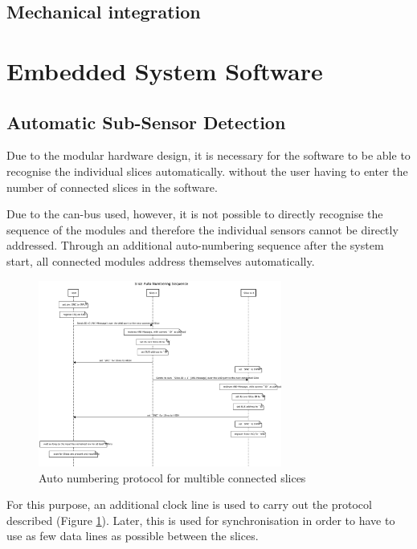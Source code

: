 \documentclass[conference]{IEEEtran}
\begin{document}
\subsection{Mechanical integration}

%



\section{Embedded System Software}

\subsection{Automatic Sub-Sensor Detection}

Due to the modular hardware design, it is necessary for the software to be able to recognise the individual slices automatically.
without the user having to enter the number of connected slices in the software.

Due to the can-bus used, however, it is not possible to directly recognise the sequence of the modules and therefore the individual sensors cannot be directly addressed.
Through an additional auto-numbering sequence after the system start, all connected modules address themselves automatically.

\begin{figure}[htbp]
\centerline{\includegraphics[width=8cm]{anp.png}}
\caption{Auto numbering protocol for multible connected slices}
\label{anp_fig}
\end{figure}

For this purpose, an additional clock line is used to carry out the protocol described (Figure \ref{anp_fig}). Later, this is used for synchronisation in order to have to use as few data lines as possible between the slices.
\end{document}
